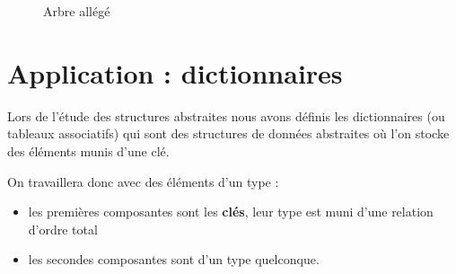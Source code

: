 \begin{figure*}
\bigskip
\caption{Arbre allégé}
\end{figure*}
\clearpage
\section{Application : dictionnaires}

Lors de l'étude des structures abstraites nous avons définis les dictionnaires (ou tableaux associatifs) qui sont des structures de données abstraites où l'on stocke des éléments munis d'une clé.

On travaillera donc  avec des éléments d'un type  :

\begin{itemize}
    \item les premières composantes sont les {\bf clés}, leur type est muni d'une relation d'ordre total
    \item les secondes composantes sont d'un type quelconque.
\end{itemize}


